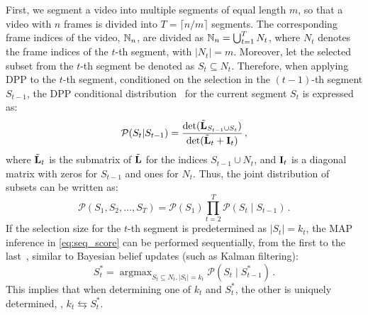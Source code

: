 First, we segment a video into multiple segments of equal length \(m\), so that a video with \(n\) frames is divided into \(T = \lceil n/m \rceil\) segments. 
The corresponding frame indices of the video, \(\mathbb{N}_n\), are divided as \(\mathbb{N}_n = \bigcup_{t=1}^{T} N_t\), 
where \(N_t\) denotes the frame indices of the \(t\)-th segment, with $|N_t|=m$.
Moreover, let the selected subset from the \(t\)-th segment be denoted as \(S_t \subseteq N_t\).
%
Therefore, when applying DPP to the \(t\)-th segment, conditioned on the selection in the \((t-1)\)-th segment \(S_{t-1}\), 
the DPP conditional distribution~\cite{gong2014diverse} for the current segment \(S_t\) is expressed as:
\begin{equation}\label{eq:cond_dpp}
    \mathcal{P}(S_t | S_{t-1}) = \frac{\det(\tilde{\mathbf{L}}_{S_{t-1} \cup S_t})}{\det(\tilde{\mathbf{L}}_t + \mathbf{I}_t)} \,,
\end{equation}
where \(\tilde{\mathbf{L}}_t\) is the submatrix of \(\tilde{\mathbf{L}}\) for the indices \(S_{t-1} \cup N_t\), and \(\mathbf{I}_t\) is a diagonal matrix with zeros for \(S_{t-1}\) and ones for \(N_t\).
%
Thus, the joint distribution of subsets can be written as:
\begin{equation}\label{eq:seq_score}
    \mathcal{P}(S_1, S_2, \dots, S_T) 
        = \mathcal{P}(S_1) \prod_{t=2}^{T} \mathcal{P}(S_t \mid S_{t-1}) \,.
\end{equation}
%
If the selection size for the \(t\)-th segment is predetermined as \(|S_t| = k_t\),
the MAP inference in \cref{eq:seq_score} can be performed sequentially, from the first to the last~\cite{gong2014diverse}, similar to Bayesian belief updates (such as Kalman filtering):
\begin{equation}\label{eq:map_inf}
    S_t^* = \mathop{\mathrm{argmax}}_{S_t \subseteq N_t, |S_t|=k_t} \mathcal{P}(S_t \mid S_{t-1}^*) \,.
\end{equation}
This implies that when determining one of \(k_t\) and \(S_t^*\), the other is uniquely determined, \ie, \(k_t \leftrightarrows S_t^*\).


